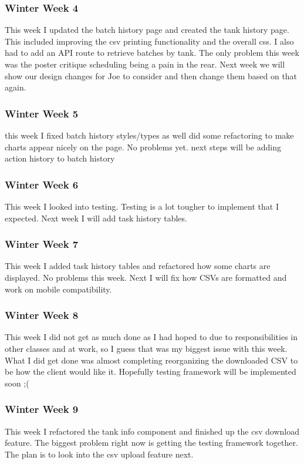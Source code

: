     \subsubsection{Winter Week 4}
        \noindent
        This week I updated the batch history page and created the tank history page. This included improving the csv printing functionality and the overall css. I also had to add an API route to retrieve batches by tank.
        The only problem this week was the poster critique scheduling being a pain in the rear.
        Next week we will show our design changes for Joe to consider and then change them based on that again.
    \subsubsection{Winter Week 5}
        \noindent
        this week I fixed batch history styles/types as well did some refactoring to make charts appear nicely on the page.
        No problems yet.
        next steps will be adding action history to batch history 
    \subsubsection{Winter Week 6}
        \noindent
        This week I looked into testing.
        Testing is a lot tougher to implement that I expected.
        Next week I will add task history tables.
    \subsubsection{Winter Week 7}
        \noindent
        This week I added task history tables and refactored how some charts are displayed.
        No problems this week.
        Next I will fix how CSVs are formatted and work on mobile compatibility.
    \subsubsection{Winter Week 8}
        \noindent
        This week I did not get as much done as I had hoped to due to responsibilities in other classes and at work, so I guess that was my biggest issue with this week.
        What I did get done was almost completing reorganizing the downloaded CSV to be how the client would like it.
        Hopefully testing framework will be implemented soon ;(
    \subsubsection{Winter Week 9}
        \noindent
        This week I refactored the tank info component and finished up the csv download feature.
        The biggest problem right now is getting the testing framework together.
        The plan is to look into the csv upload feature next.
